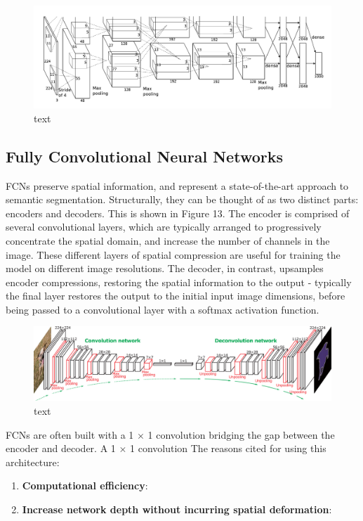 \documentclass[a4paper]{article}
\begin{document}
\begin{figure}[h]
\centering
\includegraphics[scale=0.25]{alexnet}
\caption{text}
\end{figure}

\clearpage

\subsection{Fully Convolutional Neural Networks}
FCNs preserve spatial information, and represent a state-of-the-art approach to semantic segmentation. Structurally, they can be thought of as two distinct parts: encoders and decoders. This is shown in Figure 13. The encoder is comprised of several convolutional layers, which are typically arranged to progressively concentrate the spatial domain, and increase the number of channels in the image. These different layers of spatial compression are useful for training the model on different image resolutions. The decoder, in contrast, upsamples encoder compressions, restoring the spatial information to the output - typically the final layer restores the output to the initial input image dimensions, before being passed to a convolutional layer with a softmax activation function.
\begin{figure}[h]
\centering
\includegraphics[scale=0.25]{FCN}
\caption{text}
\end{figure}

FCNs are often built with a 1 $\times$ 1 convolution bridging the gap between the encoder and decoder. A 1 $\times$ 1 convolution The reasons cited for using this architecture:
\begin{enumerate}
\item \textbf{Computational efficiency}:
\item \textbf{Increase network depth without incurring spatial deformation}: 
\end{enumerate}
\end{document}
